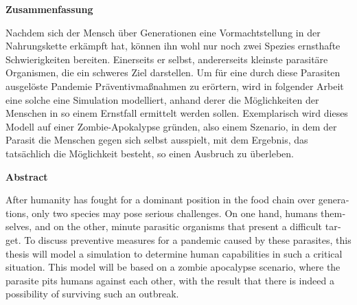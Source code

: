 \label{sec:abstract}
    \begin{center}
      \textbf{Zusammenfassung}
    \end{center}
    Nachdem sich der Mensch über Generationen eine Vormachtstellung in der Nahrungskette erkämpft hat, können ihn wohl nur noch zwei Spezies ernsthafte Schwierigkeiten bereiten. Einerseits er selbst, andererseits kleinste parasitäre Organismen, die ein schweres Ziel darstellen. Um für eine durch diese Parasiten ausgelöste Pandemie Präventivmaßnahmen zu erörtern, wird in folgender Arbeit eine solche eine Simulation modelliert, anhand derer die Möglichkeiten der Menschen in so einem Ernstfall ermittelt werden sollen. Exemplarisch wird dieses Modell auf einer Zombie-Apokalypse gründen, also einem Szenario, in dem der Parasit die Menschen gegen sich selbst ausspielt, mit dem Ergebnis, das tatsächlich die Möglichkeit besteht, so einen Ausbruch zu überleben.
\vspace{4em}
    \begin{otherlanguage}{english}
        \begin{center}
          \textbf{Abstract}
        \end{center}
        After humanity has fought for a dominant position in the food chain over generations, only two species may pose serious challenges. On one hand, humans themselves, and on the other, minute parasitic organisms that present a difficult target. To discuss preventive measures for a pandemic caused by these parasites, this thesis will model a simulation to determine human capabilities in such a critical situation. This model will be based on a zombie apocalypse scenario, where the parasite pits humans against each other, with the result that there is indeed a possibility of surviving such an outbreak.
    \end{otherlanguage}